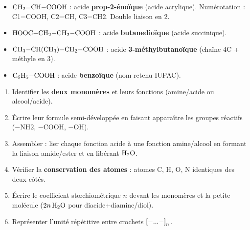 \documentclass[11pt]{article}
\begin{document}
\begin{exemplebox}
\begin{itemize}
  \item $\ce{CH2=CH-COOH}$ : acide \textbf{prop-2-énoïque} (acide acrylique). Numérotation : C1=COOH, C2=CH, C3=CH2. Double liaison en 2.
  \item $\ce{HOOC-CH2-CH2-COOH}$ : acide \textbf{butanedioïque} (acide succinique).
  \item $\ce{CH3-CH(CH3)-CH2-COOH}$ : acide \textbf{3-méthylbutanoïque} (chaîne 4C + méthyle en 3).
  \item $\ce{C6H5-COOH}$ : acide \textbf{benzoïque} (nom retenu IUPAC).
\end{itemize}
\end{exemplebox}

\begin{methode}
\begin{enumerate}
  \item Identifier les \textbf{deux monomères} et leurs fonctions (amine/acide ou alcool/acide).
  \item Écrire leur formule semi-développée en faisant apparaître les groupes réactifs ($-\mathrm{NH2}$, $-\mathrm{COOH}$, $-\mathrm{OH}$).
  \item Assembler : lier chaque fonction acide à une fonction amine/alcool en formant la liaison amide/ester et en libérant $\ce{H2O}$.
  \item Vérifier la \textbf{conservation des atomes} : atomes C, H, O, N identiques des deux côtés.
  \item Écrire le coefficient stœchiométrique $n$ devant les monomères et la petite molécule ($2n\,\ce{H2O}$ pour diacide+diamine/diol).
  \item Représenter l'unité répétitive entre crochets $\ce{[-...-]}_n$.
\end{enumerate}
\end{methode}
\end{document}
